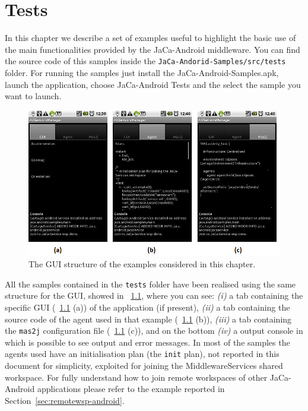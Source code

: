 \documentclass[11pt]{report}
\newcommand\xs[1]{\sectionname~\ref{sec:#1}}
\newcommand\labelfig[1]{\label{fig:#1}}
\newcommand\xf[1]{\figurename~\ref{fig:#1}}
\newcommand{\sectionname}{Section}
\newcommand\code[1]{{\mbox{\texttt{{#1}}}}}
\newcommand{\jacandroid}{\textsf{JaCa-Android}}
\begin{document}
\chapter{Tests}

In this chapter we describe a set of examples useful to highlight the basic use of the main functionalities provided by the \jacandroid{} middleware. You can find the source code of this samples inside the \code{JaCa-Andorid-Samples/src/tests} folder. For running the samples just install the \textsf{JaCa-Android-Samples.apk}, launch the application, choose \textsf{JaCa-Android Tests} and the select the sample you want to launch.
%
\begin{figure}[h!]
\begin{center}
\includegraphics[width=.9\linewidth]{images/example_gui.png}
\end{center}
\caption{The GUI structure of the examples considered in this chapter.}
\labelfig{gui-samples}
\end{figure}

All the samples contained in the \code{tests} folder have been realised using the same structure for the GUI, showed in \xf{gui-samples}, where you can see: \textit{(i)} a tab containing the specific GUI (\xf{gui-samples} (a)) of the application (if present), \textit{(ii)} a tab containing the source code of the agent used in that example (\xf{gui-samples} (b)), \textit{(iii)} a tab containing the \code{\textsf{mas2j}} configuration file (\xf{gui-samples} (c)), and on the bottom \textit{(iv)} a output console in which is possible to see output and error messages. In most of the samples the agents used have an initialisation plan (the \code{init} plan), not reported in this document for simplicity, exploited for joining the \textsf{MiddlewareServices} shared workspace. For fully understand how to join remote workspaces of other \jacandroid{} applications please refer to the example reported in \xs{remotewsp-android}.
\end{document}
